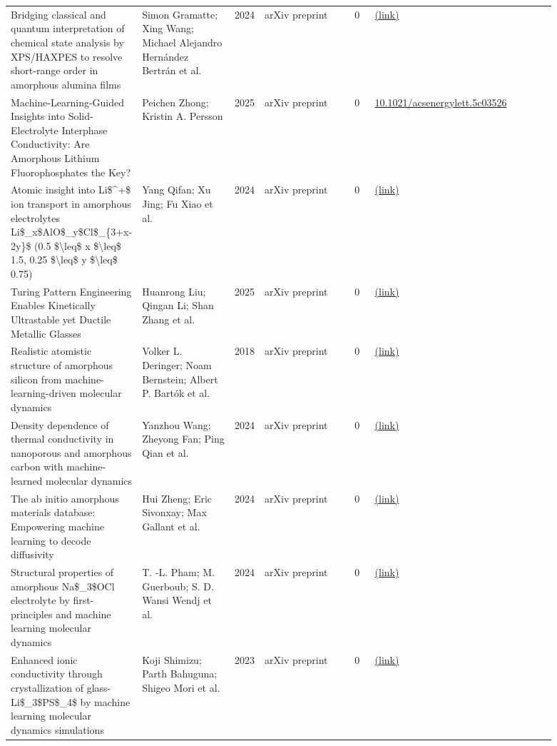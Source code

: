 \documentclass[10pt,a4paper]{article}
\begin{document}
{\begin{longtable}{p{0.192\linewidth}p{0.192\linewidth}p{0.043\linewidth}p{0.192\linewidth}p{0.043\linewidth}p{0.132\linewidth}p{0.096\linewidth}}
Bridging classical and quantum interpretation of chemical state analysis by XPS/HAXPES to resolve short-range order in amorphous alumina films & Simon Gramatte; Xing Wang; Michael Alejandro Hernández Bertrán et al. & 2024 & arXiv preprint & 0 & \href{http://arxiv.org/abs/2408.08255v2}{(link)} &  \\
Machine-Learning-Guided Insights into Solid-Electrolyte Interphase Conductivity: Are Amorphous Lithium Fluorophosphates the Key? & Peichen Zhong; Kristin A. Persson & 2025 & arXiv preprint & 0 & \href{https://doi.org/10.1021/acsenergylett.5c03526}{10.1021/acsenergylett.5c03526} &  \\
Atomic insight into Li\$\^{}+\$ ion transport in amorphous electrolytes Li\$\_x\$AlO\$\_y\$Cl\$\_\{3+x-2y\}\$ (0.5 \$\textbackslash{}leq\$ x \$\textbackslash{}leq\$ 1.5, 0.25 \$\textbackslash{}leq\$ y \$\textbackslash{}leq\$ 0.75) & Yang Qifan; Xu Jing; Fu Xiao et al. & 2024 & arXiv preprint & 0 & \href{http://arxiv.org/abs/2409.16712v1}{(link)} &  \\
Turing Pattern Engineering Enables Kinetically Ultrastable yet Ductile Metallic Glasses & Huanrong Liu; Qingan Li; Shan Zhang et al. & 2025 & arXiv preprint & 0 & \href{http://arxiv.org/abs/2512.20196v1}{(link)} &  \\
Realistic atomistic structure of amorphous silicon from machine-learning-driven molecular dynamics & Volker L. Deringer; Noam Bernstein; Albert P. Bartók et al. & 2018 & arXiv preprint & 0 & \href{http://arxiv.org/abs/1803.02802v1}{(link)} &  \\
Density dependence of thermal conductivity in nanoporous and amorphous carbon with machine-learned molecular dynamics & Yanzhou Wang; Zheyong Fan; Ping Qian et al. & 2024 & arXiv preprint & 0 & \href{http://arxiv.org/abs/2408.12390v2}{(link)} &  \\
The ab initio amorphous materials database: Empowering machine learning to decode diffusivity & Hui Zheng; Eric Sivonxay; Max Gallant et al. & 2024 & arXiv preprint & 0 & \href{http://arxiv.org/abs/2402.00177v1}{(link)} &  \\
Structural properties of amorphous Na\$\_3\$OCl electrolyte by first-principles and machine learning molecular dynamics & T. -L. Pham; M. Guerboub; S. D. Wansi Wendj et al. & 2024 & arXiv preprint & 0 & \href{http://arxiv.org/abs/2404.11442v1}{(link)} &  \\
Enhanced ionic conductivity through crystallization of glass-Li\$\_3\$PS\$\_4\$ by machine learning molecular dynamics simulations & Koji Shimizu; Parth Bahuguna; Shigeo Mori et al. & 2023 & arXiv preprint & 0 & \href{http://arxiv.org/abs/2312.06963v1}{(link)} &  \\

\end{longtable}}
\end{document}
